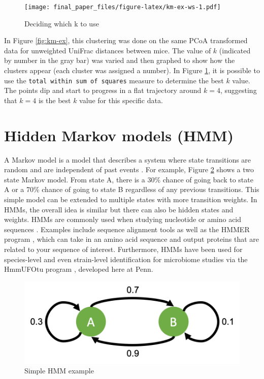 \documentclass[12pt,openany]{book}
\begin{document}
\begin{figure}
\centering
\texttt{[image: final\_paper\_files/figure-latex/km-ex-ws-1.pdf]}
\caption{\label{fig:km-ex-ws}Deciding which k to use}
\end{figure}

In Figure \ref{fig:km-ex}, this clustering was done on the same PCoA
transformed data for unweighted UniFrac distances between mice. The
value of \(k\) (indicated by number in the gray bar) was varied and then
graphed to show how the clusters appear (each cluster was assigned a
number). In Figure \ref{fig:km-ex-ws}, it is possible to use the
\texttt{total\ within\ sum\ of\ squares} measure to determine the best
\(k\) value. The points dip and start to progress in a flat trajectory
around \(k=4\), suggesting that \(k=4\) is the best \(k\) value for this
specific data.

\section{Hidden Markov models (HMM)}\label{hidden-markov-models-hmm}

A Markov model is a model that describes a system where state
transitions are random and are independent of past events
\citep{rabiner1986introduction, eddy2004hidden}. For example, Figure
\ref{fig:mm-fig} shows a two state Markov model. From state A, there is
a 30\% chance of going back to state A or a 70\% chance of going to
state B regardless of any previous transitions. This simple model can be
extended to multiple states with more transition weights. In HMMs, the
overall idea is similar but there can also be hidden states and weights.
HMMs are commonly used when studying nucleotide or amino acid sequences
\citep{eddy1998profile, eddy2004hidden}. Examples include sequence
alignment tools as well as the HMMER program \citep{finn2011hmmer},
which can take in an amino acid sequence and output proteins that are
related to your sequence of interest. Furthermore, HMMs have been used
for species-level and even strain-level identification for microbiome
studies via the HmmUFOtu program \citep{zheng2018hmmufotu}, developed
here at Penn.

\begin{figure}

{\centering \includegraphics[width=0.35\linewidth]{fig/mm_fig} 

}

\caption{Simple HMM example}\label{fig:mm-fig}
\end{figure}
\end{document}
